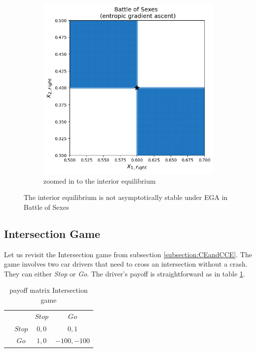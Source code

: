 \begin{figure}[H]
\begin{subfigure}{.51\textwidth}
    \includegraphics[width=\textwidth]{logos/BattleOfSexes5.png}
    \caption{zoomed in to the interior equilibrium}
    \label{fig:BOS3b}
\end{subfigure}
\caption{The interior equilibrium is not asymptotically stable under EGA in Battle of Sexes}
\label{fig:BOS3}
\end{figure}


\subsection{Intersection Game}\label{subsection:intersectionGame}

Let us revisit the Intersection game from subsection \ref{subsection:CEandCCE}. The game involves two car drivers that need to cross an intersection without a crash. They can either \textit{Stop} or \textit{Go}. The driver's payoff is straightforward as in table \ref{tab:payoffIntersection}. 

\begin{table}[H]\centering
\setlength{\extrarowheight}{2pt}
\begin{tabular}{cc|c|c|}
  & \multicolumn{1}{c}{} & \multicolumn{1}{c}{$Stop$}  & \multicolumn{1}{c}{$Go$} \\\cline{3-4}
  & $Stop$ & $0,0$ & $0,1$ \\\cline{3-4}
  & $Go$ & $1,0$ & $-100,-100$ \\\cline{3-4}
\end{tabular}\caption{\label{tab:payoffIntersection}payoff matrix Intersection game}
\end{table}

